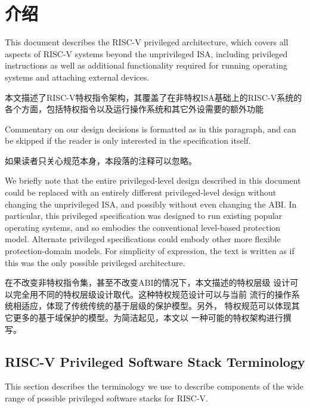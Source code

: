 \chapter{ 介绍
}

This document describes the RISC-V privileged architecture, which
covers all aspects of RISC-V systems beyond the unprivileged ISA,
including privileged instructions as well as additional functionality
required for running operating systems and attaching external devices.

本文描述了RISC-V特权指令架构，其覆盖了在非特权ISA基础上的RISC-V系统的
各个方面，包括特权指令以及运行操作系统和其它外设需要的额外功能

\begin{commentary}
Commentary on our design decisions is formatted as in this paragraph,
and can be skipped if the reader is only interested in the
specification itself.

如果读者只关心规范本身，本段落的注释可以忽略。
\end{commentary}

\begin{commentary}
We briefly note that the entire privileged-level design described in
this document could be replaced with an entirely different
privileged-level design without changing the unprivileged ISA, and
possibly without even changing the ABI.  In particular, this
privileged specification was designed to run existing popular
operating systems, and so embodies the conventional level-based
protection model.  Alternate privileged specifications could embody
other more flexible protection-domain models.  For simplicity of
expression, the text is written as if this was the only possible
privileged architecture.

在不改变非特权指令集，甚至不改变ABI的情况下，本文描述的特权层级
设计可以完全用不同的特权层级设计取代。这种特权规范设计可以与当前
流行的操作系统相适应，体现了传统传统的基于层级的保护模型。另外，
特权规范可以体现其它更多的基于域保护的模型。为简洁起见，本文以
一种可能的特权架构进行撰写。
\end{commentary}

\section{RISC-V Privileged Software Stack Terminology}

This section describes the terminology we use to describe components
of the wide range of possible privileged software stacks for RISC-V.


